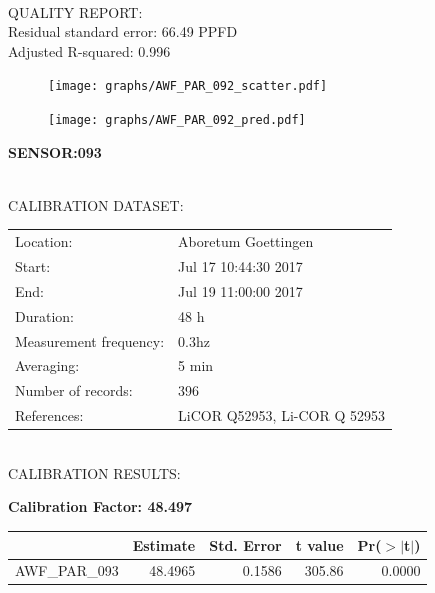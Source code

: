 \documentclass[oneside]{report}
\begin{document}
\hrulefill\\
QUALITY REPORT:\\
Residual standard error: 66.49 PPFD\\
Adjusted R-squared: 0.996



\begin{figure}[H]
  \centering
  \texttt{[image: graphs/AWF\_PAR\_092\_scatter.pdf]}
\end{figure}




\begin{figure}[H]
  \centering
  \texttt{[image: graphs/AWF\_PAR\_092\_pred.pdf]}
\end{figure}

\pagebreak


\begin{center}
\large{\textbf{SENSOR:093}}\\
\end{center}

\hrulefill\\
CALIBRATION DATASET:\\
\begin{table}[h!]
  \centering
  \label{tab:table1}
  \begin{tabular}{ll}
    Location: & Aboretum Goettingen\\ 
    
    
    Start:  & Jul 17 10:44:30 2017 \\
    End:   & Jul 19 11:00:00 2017\\ 
    Duration: & 48 h\\
    Measurement frequency: & 0.3hz\\
    Averaging:  &5 min\\
    Number of records: & 396 \\
    References: & LiCOR Q52953, Li-COR Q 52953 \\
  \end{tabular}
\end{table}

\hrulefill\\
CALIBRATION RESULTS:\\


\begin{center}
\textbf{\large{Calibration Factor: 48.497}}\\
\end{center}
\begin{table}[ht]
\centering
\begin{tabular}{rrrrr}
  \hline
 & Estimate & Std. Error & t value & Pr($>$$|$t$|$) \\ 
  \hline
AWF\_PAR\_093 & 48.4965 & 0.1586 & 305.86 & 0.0000 \\ 
   \hline
\end{tabular}
\end{table}
\end{document}
